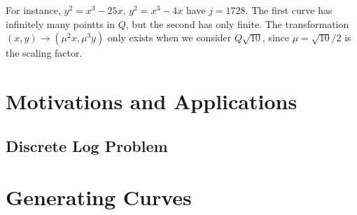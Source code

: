 \documentclass[12pt,twoside]{article}
\begin{document}
For instance, $y^{2} = x^{3} - 25x$, $y^{2} = x^{3} - 4x$ have $j=1728$. The first curve has infinitely many pointts in $Q$, but the second has only finite. The transformation $(x,y) \rightarrow (\mu^{2}x, \mu^{3}y)$ only exists when we consider $Q\sqrt{10}$, since $\mu = \sqrt{10}/2$ is the scaling factor. 





\section{Motivations and Applications} 

\subsection{Discrete Log Problem}


\section{Generating Curves} 















\end{document}
